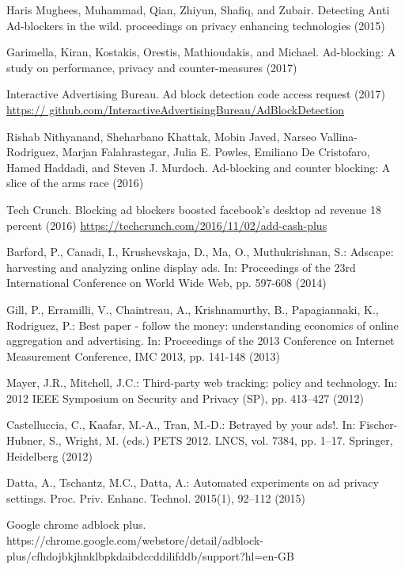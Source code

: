 \documentclass[runningheads,a4paper]{llncs}
\begin{document}
\begin{thebibliography}{x}

 Haris Mughees, Muhammad, Qian, Zhiyun, Shafiq, and Zubair. Detecting Anti Ad-blockers in
the wild. proceedings on privacy enhancing technologies (2015)

 Garimella, Kiran, Kostakis, Orestis, Mathioudakis, and Michael. Ad-blocking: A study on performance, privacy and counter-measures (2017)

 Interactive Advertising Bureau. Ad block detection code access request (2017) \url{https://
github.com/InteractiveAdvertisingBureau/AdBlockDetection}

 Rishab Nithyanand, Sheharbano Khattak, Mobin Javed, Narseo Vallina-Rodriguez, Marjan
Falahrastegar, Julia E. Powles, Emiliano De Cristofaro, Hamed Haddadi, and Steven J. Murdoch. Ad-blocking and counter blocking: A slice of the arms race (2016)

 Tech Crunch. Blocking ad blockers boosted facebook’s desktop ad revenue 18 percent (2016) \url{https://techcrunch.com/2016/11/02/add-cash-plus}

 Barford, P., Canadi, I., Krushevskaja, D., Ma, O., Muthukrishnan, S.: Adscape:
harvesting and analyzing online display ads. In:  Proceedings of the 23rd International Conference on World Wide Web, pp. 597-608 (2014)

 Gill, P., Erramilli, V., Chaintreau, A., Krishnamurthy, B., Papagiannaki, K., Rodriguez, P.: Best paper - follow the money: understanding economics of online aggregation and advertising. In: Proceedings of the 2013 Conference on Internet Measurement Conference, IMC 2013, pp. 141-148  (2013)

 Mayer, J.R., Mitchell, J.C.: Third-party web tracking: policy and technology. In: 2012 IEEE Symposium on Security and Privacy (SP), pp. 413–427 (2012)

 Castelluccia, C., Kaafar, M.-A., Tran, M.-D.: Betrayed by your ads!. In: Fischer-
Hubner, S., Wright, M. (eds.) PETS 2012. LNCS, vol. 7384, pp. 1–17. Springer, Heidelberg (2012)

 Datta, A., Tschantz, M.C., Datta, A.: Automated experiments on ad privacy settings. Proc. Priv. Enhanc. Technol. 2015(1), 92–112 (2015)

 Google chrome adblock plus. https://chrome.google.com/webstore/detail/adblock-plus/cfhdojbkjhnklbpkdaibdccddilifddb/support?hl=en-GB


\end{thebibliography}
\end{document}
